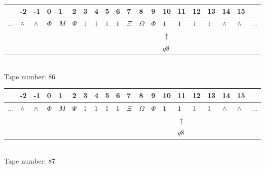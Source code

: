 \documentclass[11pt]{article}
\begin{document}
\begin{table}[H]
\centering
\begin{tabular}{llllllllllllllllllll}
 & -2 & -1 & 0 & 1 & 2 & 3 & 4 & 5 & 6 & 7 & 8 & 9 & 10 & 11 & 12 & 13 & 14 & 15 & \\
\hline
$...$ & \multicolumn{1}{|l|}{$\wedge$} & \multicolumn{1}{|l|}{$\wedge$} & \multicolumn{1}{|l|}{$\Phi$} & \multicolumn{1}{|l|}{$M$} & \multicolumn{1}{|l|}{$\Psi$} & \multicolumn{1}{|l|}{$1$} & \multicolumn{1}{|l|}{$1$} & \multicolumn{1}{|l|}{$1$} & \multicolumn{1}{|l|}{$1$} & \multicolumn{1}{|l|}{$\Xi$} & \multicolumn{1}{|l|}{$\Omega$} & \multicolumn{1}{|l|}{$\Phi$} & \multicolumn{1}{|l|}{$1$} & \multicolumn{1}{|l|}{$1$} & \multicolumn{1}{|l|}{$1$} & \multicolumn{1}{|l|}{$1$} & \multicolumn{1}{|l|}{$\wedge$} & \multicolumn{1}{|l|}{$\wedge$} & $...$\\
\hline
&  &  &  &  &  &  &  &  &  &  &  &  & $\uparrow$ &  &  &  &  &  &  \\
&  &  &  &  &  &  &  &  &  &  &  &  & $ q8 $ &  &  &  &  &  &  \\
\end{tabular}
\\
Tape number: 86
\noindent\makebox[\linewidth]{\hdashrule{\textwidth}{1pt}{1pt}}\end{table}

\begin{table}[H]
\centering
\begin{tabular}{llllllllllllllllllll}
 & -2 & -1 & 0 & 1 & 2 & 3 & 4 & 5 & 6 & 7 & 8 & 9 & 10 & 11 & 12 & 13 & 14 & 15 & \\
\hline
$...$ & \multicolumn{1}{|l|}{$\wedge$} & \multicolumn{1}{|l|}{$\wedge$} & \multicolumn{1}{|l|}{$\Phi$} & \multicolumn{1}{|l|}{$M$} & \multicolumn{1}{|l|}{$\Psi$} & \multicolumn{1}{|l|}{$1$} & \multicolumn{1}{|l|}{$1$} & \multicolumn{1}{|l|}{$1$} & \multicolumn{1}{|l|}{$1$} & \multicolumn{1}{|l|}{$\Xi$} & \multicolumn{1}{|l|}{$\Omega$} & \multicolumn{1}{|l|}{$\Phi$} & \multicolumn{1}{|l|}{$1$} & \multicolumn{1}{|l|}{$1$} & \multicolumn{1}{|l|}{$1$} & \multicolumn{1}{|l|}{$1$} & \multicolumn{1}{|l|}{$\wedge$} & \multicolumn{1}{|l|}{$\wedge$} & $...$\\
\hline
&  &  &  &  &  &  &  &  &  &  &  &  &  & $\uparrow$ &  &  &  &  &  \\
&  &  &  &  &  &  &  &  &  &  &  &  &  & $ q8 $ &  &  &  &  &  \\
\end{tabular}
\\
Tape number: 87
\noindent\makebox[\linewidth]{\hdashrule{\textwidth}{1pt}{1pt}}\end{table}
\end{document}
